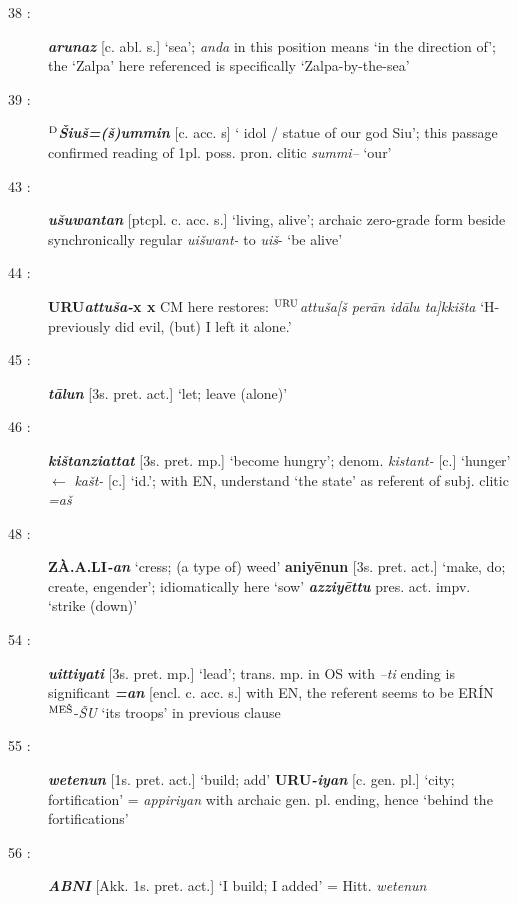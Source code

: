 \documentclass[10pt]{article}
\newcommand{\supersc}[1]{$^{\textrm{\scriptsize{#1}}}$}  	%
\newcommand{\bit}[1]{\textbf{\textit{#1}}}				%
\newcommand{\p}[1]{{\tiny[{#1}]}}					%
\newcommand{\hith}{\textsubwedge{h}}
\newcommand{\Hith}{\textsubwedge{H}}
\newcommand{\mpl}{\supersc{ME\v{S}}}
\renewcommand{\.}[1]{\textsubdot{#1}}
\begin{document}
\begin{description}
\item[38 :] \bit{arunaz} \p{c. abl. s.} `sea'; \textit{anda} in this position means `in the direction of'; the `Zalpa' here referenced is specifically `Zalpa-by-the-sea'

\item[39 :] \textbf{\supersc{D}}\bit{\v{S}iu\v{s}=(\v{s})ummin} \p{c. acc. s} ` idol / statue of our god Siu'; this passage confirmed reading of 1pl. poss. pron. clitic \textit{summi--} `our'

\item[43 :] \bit{{\hith}u\v{s}uwantan} \p{ptcpl. c. acc. s.} `living, alive'; archaic zero-grade form beside synchronically regular \textit{{\hith}ui\v{s}want-} to \textit{{\hith}ui\v{s}}- `be alive'

\item[44 :] \textbf{URU}\bit{{\Hith}attu\v{s}a-}\textbf{x x} CM here restores: \supersc{URU}\textit{{\Hith}attu\v{s}a[\v{s} per\=an id\=alu ta]kki\v{s}ta} `H- previously did evil, (but) I left it alone.'

\item[45 :] \bit{t\=al{\hith\hith}un} \p{3s. pret. act.} `let; leave (alone)' 

\item[46 :] \bit{ki\v{s}tanziattat} \p{3s. pret. mp.} `become hungry'; denom. \textit{kistant-} \p{c.} `hunger' $\leftarrow$ \textit{ka\v{s}t-} \p{c.} `id.'; with EN, understand `the state' as referent of subj. clitic \textit{=a\v{s}}

\item[48 :] \textbf{Z\`A.A{\Hith}.LI}\bit{-an} `cress; (a type of) weed' \textbf{aniy\=enun} \p{3s. pret. act.} `make, do; create, engender'; idiomatically here `sow' \textbf{\textit{{\hith}azziy\=ettu}}  pres. act. impv. `strike (down)'

\item[54 :] \bit{{\hith}uittiyati} \p{3s. pret. mp.} `lead'; trans. mp. in OS with \textit{--ti} ending is significant \bit{=an} \p{encl. c. acc. s.} with EN, the referent seems to be ER\'IN{\mpl}-\textit{\v{S}U} `its troops' in previous clause

\item[55 :] \bit{wetenun} \p{1s. pret. act.} `build; add' {\bf URU}\bit{-iyan} \p{c. gen. pl.} `city; fortification' = \textit{{\hith}appiriyan} with archaic gen. pl. ending, hence `behind the fortifications'

\item[56 :] \bit{ABNI} \p{Akk. 1s. pret. act.} `I build; I added' = Hitt. \textit{wetenun}


\end{description}
\end{document}
